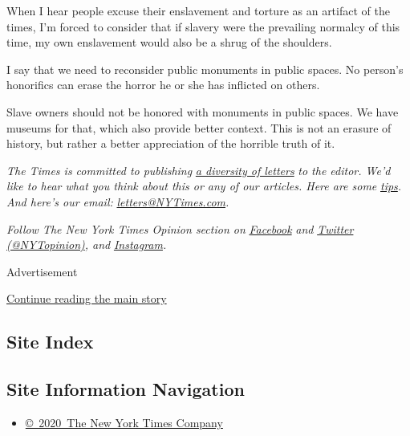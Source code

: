 When I hear people excuse their enslavement and torture as an artifact
of the times, I'm forced to consider that if slavery were the prevailing
normalcy of this time, my own enslavement would also be a shrug of the
shoulders.

I say that we need to reconsider public monuments in public spaces. No
person's honorifics can erase the horror he or she has inflicted on
others.

Slave owners should not be honored with monuments in public spaces. We
have museums for that, which also provide better context. This is not an
erasure of history, but rather a better appreciation of the horrible
truth of it.

\emph{The Times is committed to publishing}
\href{https://www.nytimes3xbfgragh.onion/2019/01/31/opinion/letters/letters-to-editor-new-york-times-women.html}{\emph{a
diversity of letters}} \emph{to the editor. We'd like to hear what you
think about this or any of our articles. Here are some}
\href{https://help.nytimes3xbfgragh.onion/hc/en-us/articles/115014925288-How-to-submit-a-letter-to-the-editor}{\emph{tips}}\emph{.
And here's our email:}
\href{mailto:letters@NYTimes.com}{\emph{letters@NYTimes.com}}\emph{.}

\emph{Follow The New York Times Opinion section on}
\href{https://www.facebookcorewwwi.onion/nytopinion}{\emph{Facebook}}
\emph{and} \href{http://twitter.com/NYTOpinion}{\emph{Twitter
(@NYTopinion)}}\emph{, and}
\href{https://www.instagram.com/nytopinion/}{\emph{Instagram}}\emph{.}

Advertisement

\protect\hyperlink{after-bottom}{Continue reading the main story}

\hypertarget{site-index}{%
\subsection{Site Index}\label{site-index}}

\hypertarget{site-information-navigation}{%
\subsection{Site Information
Navigation}\label{site-information-navigation}}

\begin{itemize}
\tightlist
\item
  \href{https://help.nytimes3xbfgragh.onion/hc/en-us/articles/115014792127-Copyright-notice}{©~2020~The
  New York Times Company}
\end{itemize}

